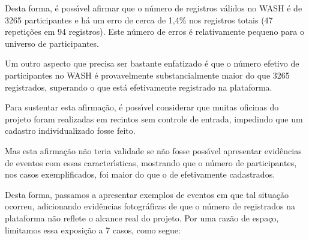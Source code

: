 \documentclass[
12pt,		%
openright,	%
twoside,  %
a4paper,			%
chapter=TITLE,		%
english,			%
french,				%
spanish,			%
brazil				%
]{USPSC-classe/USPSC_RedarTex}
\begin{document}
Desta forma, \'e poss\'{\i}vel afirmar que o n\'umero de registros v\'alidos no WASH \'e de 3265 participantes e h\'a um erro de cerca de 1,4\% nos registros totais (47 repeti\c{c}\~oes em 94 registros). Este n\'umero de erros \'e relativamente pequeno para o universo de participantes.










Um outro aspecto que precisa ser bastante enfatizado \'e que o n\'umero efetivo de participantes no WASH \'e provavelmente substancialmente maior do que 3265 registrados, superando o que est\'a efetivamente registrado na plataforma.










Para sustentar esta afirma\c{c}\~ao, \'e poss\'{\i}vel considerar que muitas oficinas do projeto foram realizadas em recintos sem controle de entrada, impedindo que um cadastro individualizado fosse feito.










Mas esta afirma\c{c}\~ao n\~ao teria validade se n\~ao fosse poss\'{\i}vel apresentar evid\^encias de eventos com essas caracter\'{\i}sticas, mostrando que o n\'umero de participantes, nos casos exemplificados, foi maior do que o de efetivamente cadastrados.










Desta forma, passamos a apresentar exemplos de eventos em que tal situa\c{c}\~ao ocorreu, adicionando evid\^encias fotogr\'aficas de que o n\'umero de registrados na plataforma n\~ao reflete o alcance real do projeto. Por uma raz\~ao de espa\c{c}o, limitamos essa exposi\c{c}\~ao a 7 casos, como segue:
\end{document}
